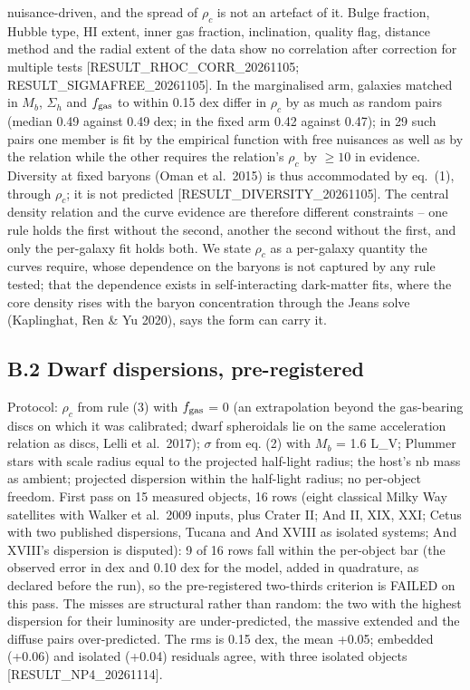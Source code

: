 \documentclass[
  10pt,
]{article}
\begin{document}
nuisance-driven, and the spread of $\rho_c$ is not an artefact of it. Bulge fraction, Hubble type, HI extent, inner gas fraction, inclination, quality flag, distance method and the radial extent of the data show no correlation after correction for multiple tests {[}RESULT\_RHOC\_CORR\_20261105; RESULT\_SIGMAFREE\_20261105{]}. In the marginalised arm, galaxies matched in $M_b$, $\Sigma_h$ and $f_{\rm gas}$ to within 0.15 dex differ in $\rho_c$ by as much as random pairs (median 0.49 against 0.49 dex; in the fixed arm 0.42 against 0.47); in 29 such pairs one member is fit by the empirical function with free nuisances as well as by the relation while the other requires the relation's $\rho_c$ by $\geq10$ in evidence. Diversity at fixed baryons (Oman et al.~2015) is thus accommodated by eq.~(1), through $\rho_c$; it is not predicted {[}RESULT\_DIVERSITY\_20261105{]}. The central density relation and the curve evidence are therefore different constraints -- one rule holds the first without the second, another the second without the first, and only the per-galaxy fit holds both. We state $\rho_c$ as a per-galaxy quantity the curves require, whose dependence on the baryons is not captured by any rule tested; that the dependence exists in self-interacting dark-matter fits, where the core density rises with the baryon concentration through the Jeans solve (Kaplinghat, Ren \& Yu 2020), says the form can carry it.

\subsection{B.2 Dwarf dispersions, pre-registered}

Protocol: $\rho_c$ from rule (3) with $f_{\rm gas}$ = 0 (an extrapolation beyond the gas-bearing discs on which it was calibrated; dwarf spheroidals lie on the same acceleration relation as discs, Lelli et al.~2017); $\sigma$ from eq. (2) with $M_b$ = 1.6 L\_V; Plummer stars with scale radius equal to the projected half-light radius; the host's nb mass as ambient; projected dispersion within the half-light radius; no per-object freedom. First pass on 15 measured objects, 16 rows (eight classical Milky Way satellites with Walker et al.~2009 inputs, plus Crater II; And II, XIX, XXI; Cetus with two published dispersions, Tucana and And XVIII as isolated systems; And XVIII's dispersion is disputed): 9 of 16 rows fall within the per-object bar (the observed error in dex and 0.10 dex for the model, added in quadrature, as declared before the run), so the pre-registered two-thirds criterion is FAILED on this pass. The misses are structural rather than random: the two with the highest dispersion for their luminosity are under-predicted, the massive extended and the diffuse pairs over-predicted. The rms is 0.15 dex, the mean +0.05; embedded (+0.06) and isolated (+0.04) residuals agree, with three isolated objects {[}RESULT\_NP4\_20261114{]}.
\end{document}
